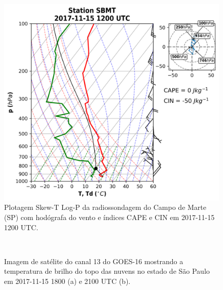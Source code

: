\begin{figure}[hp]
	\begin{center}
		\caption{Plotagem Skew-T Log-P da radiossondagem do Campo de Marte (SP) com hodógrafa do vento e índices CAPE e CIN em 2017-11-15 1200 UTC.} 
		\label{sondagem_20171115}
		\includegraphics[width=0.75\columnwidth]{../Sounding_Processing/figures/sounding_SBMT2017111512UTC.png}
	\end{center}
\end{figure}



\begin{figure}[hp]
	\begin{center}
		\caption{Imagem de satélite do canal 13 do GOES-16 mostrando a temperatura de brilho do topo das nuvens no estado de São Paulo em 2017-11-15 1800 (a) e 2100 UTC (b).} 
		\label{goes16_sp_20171115}
		 \\
	\end{center}
\end{figure}

